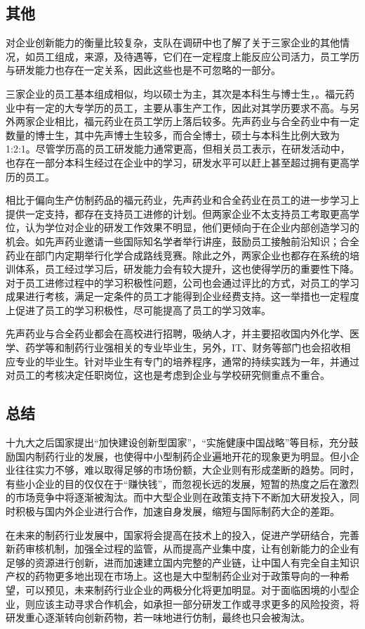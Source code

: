 \documentclass{apa6}
\begin{document}
			\subsection{其他}
			对企业创新能力的衡量比较复杂，支队在调研中也了解了关于三家企业的其他情况，如员工组成，来源，及待遇等，它们在一定程度上能反应公司活力，员工学历与研发能力也存在一定关系，因此这些也是不可忽略的一部分。
			
			三家企业的员工基本组成相似，均以硕士为主，其次是本科生与博士生，。福元药业中有一定的大专学历的员工，主要从事生产工作，因此对其学历要求不高。与另外两家企业相比，福元药业在员工学历上落后较多。先声药业与合全药业中有一定数量的博士生，其中先声博士生较多，而合全博士，硕士与本科生比例大致为1:2:1。尽管学历高的员工研发能力通常更高，但相关员工表示，在研发活动中，也存在一部分本科生经过在企业中的学习，研发水平可以赶上甚至超过拥有更高学历的员工。
			
			相比于偏向生产仿制药品的福元药业，先声药业和合全药业在员工的进一步学习上提供一定支持，都存在支持员工进修的计划。但两家企业不太支持员工考取更高学位，认为学位对企业的研发工作效果不明显，他们更倾向于在企业内部创造学习的机会。如先声药业邀请一些国际知名学者举行讲座，鼓励员工接触前沿知识；合全药业在部门内定期举行化学合成路线竞赛。除此之外，两家企业也都存在系统的培训体系，员工经过学习后，研发能力会有较大提升，这也使得学历的重要性下降。对于员工进修过程中的学习积极性问题，公司也会通过评比的方式，对员工的学习成果进行考核，满足一定条件的员工才能得到企业经费支持。这一举措也一定程度上促进了员工的学习积极性，尽可能提高了员工的学习效率。
			
			先声药业与合全药业都会在高校进行招聘，吸纳人才，并主要招收国内外化学、医学、药学等和制药行业强相关的专业毕业生，另外，IT、财务等部门也会招收相应专业的毕业生。针对毕业生有专门的培养程序，通常的持续实践为一年，并通过对员工的考核决定任职岗位，这也是考虑到企业与学校研究侧重点不重合。
			
	
	
\subsection{总结}
	十九大之后国家提出“加快建设创新型国家”，“实施健康中国战略”等目标，充分鼓励国内制药行业的发展\citep{RN38}，也使得中小型制药企业遍地开花的现象更为明显。但小企业往往实力不够，难以取得足够的市场份额，大企业则有形成垄断的趋势。同时，有些小企业的目的仅仅在于“赚快钱”，而忽视长远的发展，短暂的热度之后在激烈的市场竞争中将逐渐被淘汰。而中大型企业则在政策支持下不断加大研发投入，同时积极与国内外企业进行合作，加速自身发展，缩短与国际制药大企的差距。
	
	在未来的制药行业发展中，国家将会提高在技术上的投入，促进产学研结合，完善新药审核机制，加强全过程的监管，从而提高产业集中度，让有创新能力的企业有足够的资源进行创新，进而加速建立国内完整的产业链，让中国人有完全自主知识产权的药物更多地出现在市场上。这也是大中型制药企业对于政策导向的一种希望，可以预见，未来制药行业企业的两极分化将更加明显。对于面临困境的小型企业，则应该主动寻求合作机会，如承担一部分研发工作或寻求更多的风险投资，将研发重心逐渐转向创新药物，若一味地进行仿制，最终也只会被淘汰。

	
	
\end{document}
